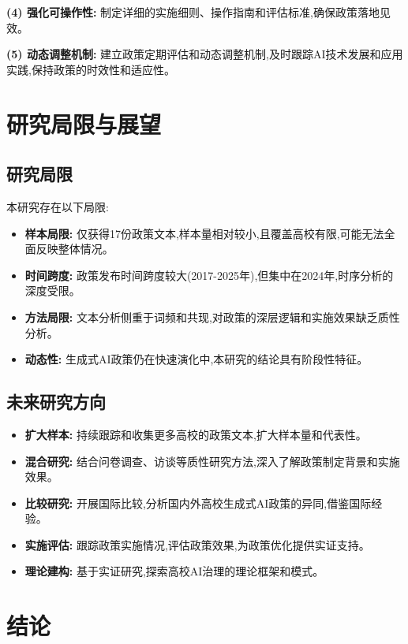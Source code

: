 \documentclass[cn,11pt,chinese]{article}
\begin{document}
\textbf{(4) 强化可操作性:} 制定详细的实施细则、操作指南和评估标准,确保政策落地见效。

\textbf{(5) 动态调整机制:} 建立政策定期评估和动态调整机制,及时跟踪AI技术发展和应用实践,保持政策的时效性和适应性。

\section{研究局限与展望}

\subsection{研究局限}

本研究存在以下局限:
\begin{itemize}
\item \textbf{样本局限:} 仅获得17份政策文本,样本量相对较小,且覆盖高校有限,可能无法全面反映整体情况。
\item \textbf{时间跨度:} 政策发布时间跨度较大(2017-2025年),但集中在2024年,时序分析的深度受限。
\item \textbf{方法局限:} 文本分析侧重于词频和共现,对政策的深层逻辑和实施效果缺乏质性分析。
\item \textbf{动态性:} 生成式AI政策仍在快速演化中,本研究的结论具有阶段性特征。
\end{itemize}

\subsection{未来研究方向}

\begin{itemize}
\item \textbf{扩大样本:} 持续跟踪和收集更多高校的政策文本,扩大样本量和代表性。
\item \textbf{混合研究:} 结合问卷调查、访谈等质性研究方法,深入了解政策制定背景和实施效果。
\item \textbf{比较研究:} 开展国际比较,分析国内外高校生成式AI政策的异同,借鉴国际经验。
\item \textbf{实施评估:} 跟踪政策实施情况,评估政策效果,为政策优化提供实证支持。
\item \textbf{理论建构:} 基于实证研究,探索高校AI治理的理论框架和模式。
\end{itemize}

\section{结论}
\end{document}
